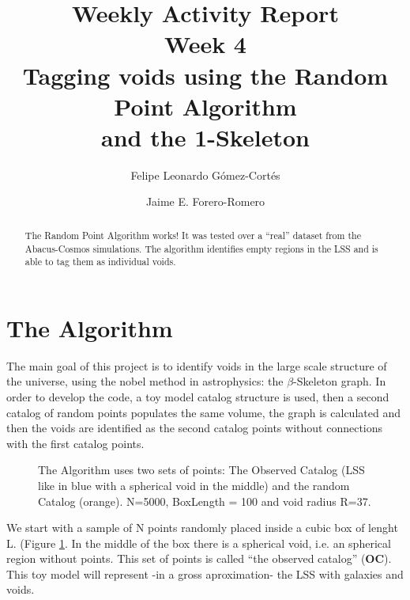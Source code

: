 \documentclass[preprint]{aastex62}
\begin{document}
\title{Weekly Activity Report\\Week 4\\Tagging voids using the Random Point Algorithm\\and the 1-Skeleton}


\author{Felipe Leonardo Gómez-Cortés}

\nocollaboration

\author{Jaime E. Forero-Romero}


\begin{abstract}
  The Random Point Algorithm works! It was tested over a ``real'' dataset from
  the Abacus-Cosmos simulations. The algorithm identifies empty regions in the
  LSS and is able to tag them as individual voids.
  

\end{abstract}

\section{The Algorithm}

The main goal of this project is to identify voids in the large scale structure
of the universe, using the nobel method in astrophysics: the $\beta$-Skeleton
graph. In order to develop the code, a toy model catalog structure is used,
then a second catalog of random points populates the same volume, the graph is
calculated and then the voids are identified as the second catalog points
without connections with the first catalog points.

\begin{figure}
    \caption{The Algorithm uses two sets of points: The Observed Catalog
      (LSS like in blue with a spherical void in the middle) and the
      random Catalog (orange).
      N=5000, BoxLength = 100 and void radius R=37. \label{slice_OC_plus_RC}}
\end{figure}

We start with a sample of N points randomly placed inside a cubic box of lenght L. (Figure \ref{slice_OC_plus_RC}.
In the middle of the box there is a spherical void, i.e. an spherical region
without points. This set of points is called ``the observed catalog''
(\textbf{OC}). This toy model
will represent -in a gross aproximation- the LSS with galaxies and voids.
\end{document}
